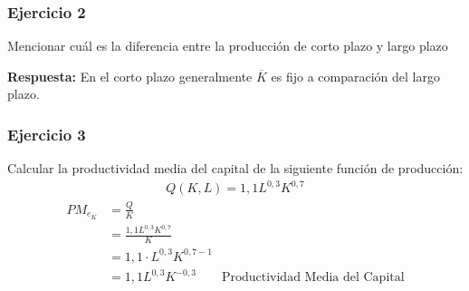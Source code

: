 \documentclass{templateNote}
\begin{document}
\newpage
\subsubsection{Ejercicio 2}
Mencionar cuál es la diferencia entre la producción de corto plazo y largo plazo

\textbf{Respuesta:}
En el corto plazo generalmente $\overline{K}$ es fijo a comparación del largo plazo.


\subsubsection{Ejercicio 3}
Calcular la productividad media del capital de la siguiente función de producción:
\begin{align*}
    Q(K, L) = 1,1L^{0,3}K^{0,7}
\end{align*}
\begin{align*}
    PM_{e_{K}} &= \frac{Q}{K} \\
    &= \frac{1,1 L^{0,3}K^{0,7}}{K} \\
    &= 1,1 \cdot L^{0,3}K^{0,7 - 1} \\
    &= 1,1L^{0,3}K^{-0,3} \qquad \text{Productividad Media del Capital}
\end{align*}
\end{document}
